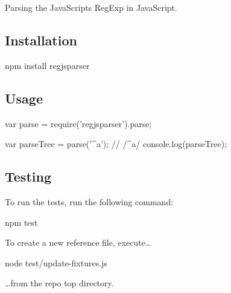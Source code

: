 Parsing the Java\+Script\textquotesingle{}s Reg\+Exp in Java\+Script.

\subsection*{Installation}


\begin{DoxyCode}
npm install regjsparser
\end{DoxyCode}


\subsection*{Usage}


\begin{DoxyCode}
var parse = require('regjsparser').parse;

var parseTree = parse('^a'); // /^a/
console.log(parseTree);
\end{DoxyCode}


\subsection*{Testing}

To run the tests, run the following command\+:


\begin{DoxyCode}
npm test
\end{DoxyCode}


To create a new reference file, execute…


\begin{DoxyCode}
node test/update-fixtures.js
\end{DoxyCode}


…from the repo top directory. 